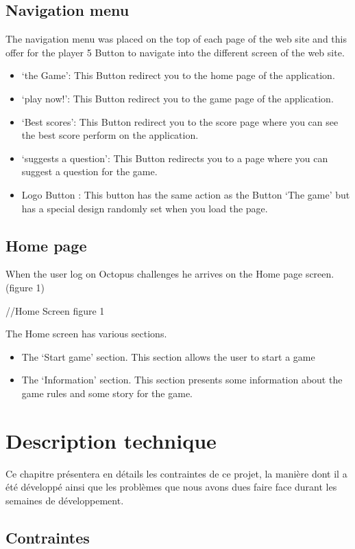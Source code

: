 \documentclass[a4paper,11pt, oneside]{book}
\begin{document}
	\section{Navigation menu}
	The navigation menu was placed on the top of each page of the web site and this offer for the player 5 Button to navigate into the different screen of the web site.
	\begin{itemize}
		\item ‘the Game’: This Button redirect you to the home page of the application.
		\item ‘play now!’: This Button redirect you to the game page of the application.
		\item ‘Best scores’: This Button redirect you to the score page where you can see the best score perform on the application.
		\item ‘suggests a question’: This Button redirects you to a page where you can suggest a question for the game.
		\item Logo Button : This button has the same action as the Button ‘The game’ but has a special design randomly set when you load the page.
	\end{itemize}
	
	\section{Home page}
	When the user log on Octopus challenges he arrives on the Home page screen. 
(figure 1)

//Home Screen figure 1

The Home screen has various sections.
\begin{itemize}
	\item The ‘Start game’ section. This section allows the user to start a game
	\item The ‘Information’ section. This section presents some information about the game rules and some story for the game.
\end{itemize}
	
	\chapter{Description technique}

	Ce chapitre présentera en détails les contraintes de ce projet, la manière dont il a été développé ainsi que les problèmes que nous avons dues faire face
	durant les semaines de développement.

	\section{Contraintes}
\end{document}

